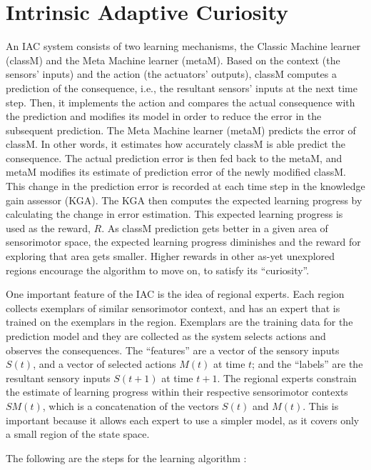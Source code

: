 \section{Intrinsic Adaptive Curiosity}

An IAC system \cite{Oudeyer2007} consists of two learning mechanisms, the Classic Machine learner (classM) and the Meta Machine learner (metaM). Based on the context (the sensors' inputs) and the action (the actuators' outputs), classM computes a prediction of the consequence, i.e., the resultant sensors' inputs at the next time step. Then, it implements the action and compares the actual consequence with the prediction and modifies its model in order to reduce the error in the subsequent prediction. The Meta Machine learner (metaM) predicts the error of classM. In other words, it estimates how accurately classM is able predict the consequence. The actual prediction error is then fed back to the metaM, and metaM modifies its estimate of prediction error of the newly modified classM. This change in the prediction error is recorded at each time step in the knowledge gain assessor (KGA). The KGA then computes the expected learning progress by calculating the change in error estimation. This expected learning progress is used as the reward, $R$. As classM prediction gets better in a given area of sensorimotor space, the expected learning progress diminishes and the reward for exploring that area gets smaller. Higher rewards in other as-yet unexplored regions encourage the algorithm to move on, to satisfy its ``curiosity''. 

One important feature of the IAC is the idea of regional experts. Each region collects exemplars of similar sensorimotor context, and has an expert that is trained on the exemplars in the region. Exemplars are the training data for the prediction model and they are collected as the system selects actions and observes the consequences. The ``features'' are a vector of the sensory inputs $S(t)$, and a vector of selected actions $M(t)$ at time $t$; and the ``labels'' are the resultant sensory inputs $S(t+1)$ at time $t+1$. The regional experts constrain the estimate of learning progress within their respective sensorimotor contexts $SM(t)$, which is a concatenation of the vectors $S(t)$ and $M(t)$. This is important because it allows each expert to use a simpler model, as it covers only a small region of the state space.  

The following are the steps for the learning algorithm \cite{Oudeyer2007}:


